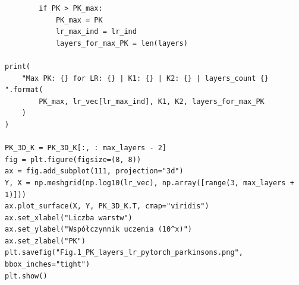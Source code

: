 \documentclass{article}
\begin{document}
\begin{verbatim}
        if PK > PK_max:
            PK_max = PK
            lr_max_ind = lr_ind
            layers_for_max_PK = len(layers)

print(
    "Max PK: {} for LR: {} | K1: {} | K2: {} | layers_count {} ".format(
        PK_max, lr_vec[lr_max_ind], K1, K2, layers_for_max_PK
    )
)

PK_3D_K = PK_3D_K[:, : max_layers - 2]
fig = plt.figure(figsize=(8, 8))
ax = fig.add_subplot(111, projection="3d")
Y, X = np.meshgrid(np.log10(lr_vec), np.array([range(3, max_layers + 1)]))
ax.plot_surface(X, Y, PK_3D_K.T, cmap="viridis")
ax.set_xlabel("Liczba warstw")
ax.set_ylabel("Współczynnik uczenia (10^x)")
ax.set_zlabel("PK")
plt.savefig("Fig.1_PK_layers_lr_pytorch_parkinsons.png", bbox_inches="tight")
plt.show()

\end{verbatim}
\newpage
\end{document}
